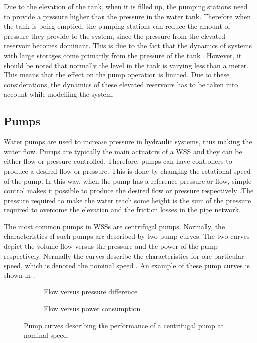 Due to the elevation of the tank, when it is filled up, the pumping stations need to provide a pressure higher than the pressure in the water tank. Therefore when the tank is being emptied, the pumping stations can reduce the amount of pressure they provide to the system, since the pressure from the elevated reservoir becomes dominant. This is due to the fact that the dynamics of systems with large storages come primarily from the pressure of the tank \cite{8thsemester_project}. However, it should be noted that normally the level in the tank is varying less than a meter. This means that the effect on the pump operation is limited. Due to these considerations, the dynamics of these elevated reservoirs has to be taken into account while modelling the system. 

\subsection{Pumps}
\label{pumps}

Water pumps are used to increase pressure in hydraulic systems, thus making the water flow. Pumps are typically the main actuators of a WSS and they can be either flow or pressure controlled. Therefore, pumps can have controllers to produce a desired flow or pressure. This is done by changing the rotational speed of the pump. In this way, when the pump has a reference pressure or flow, simple control makes it possible to produce the desired flow or pressure respectively \cite{kallesoePHD}.The pressure required to make the water reach some height is the sum of the pressure required to overcome the elevation and the friction losses in the pipe network. 

The most common pumps in WSSs are centrifugal pumps. Normally, the characteristics of such pumps are described by two pump curves. The two curves depict the volume flow versus the pressure and the power of the pump respectively. Normally the curves describe the characteristics for one particular speed, which is denoted the nominal speed \cite{kallesoePHD}. An example of these pump curves is shown in .

\begin{figure}[H]
\centering
\begin{subfigure}{.49\textwidth}
\centering
   
  \caption{Flow versus pressure difference}
  \label{fig:sub1}
\end{subfigure}
\begin{subfigure}{.49\textwidth}
\centering
   
  \caption{Flow versus power consumption}
  \label{fig:sub2}
\end{subfigure}
\caption{Pump curves describing the performance of a centrifugal pump at nominal speed.}
\label{fig:pump_curves}
\end{figure}

